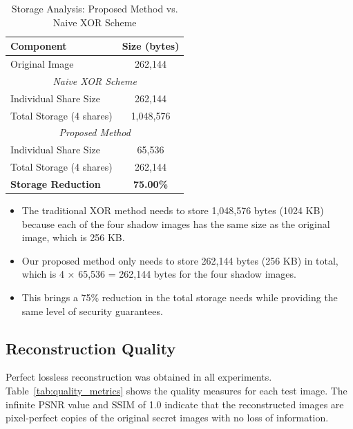 \begin{table}[h!]
\centering
\caption{Storage Analysis: Proposed Method vs. Naive XOR Scheme}
\label{tab:storage_analysis}
\begin{tabular}{|l|c|}
\hline
\textbf{Component} & \textbf{Size (bytes)} \\ \hline
Original Image & 262,144 \\ \hline
\multicolumn{2}{|c|}{\textit{Naive XOR Scheme}} \\ \hline
Individual Share Size & 262,144 \\ 
Total Storage (4 shares) & 1,048,576 \\ \hline
\multicolumn{2}{|c|}{\textit{Proposed Method}} \\ \hline
Individual Share Size & 65,536 \\ 
Total Storage (4 shares) & 262,144 \\ \hline
\textbf{Storage Reduction} & \textbf{75.00\%} \\ \hline
\end{tabular}
\end{table}

\begin{itemize}
\item The traditional XOR method needs to store 1,048,576 bytes (1024 KB) because each of the four shadow images has the same size as the original image, which is 256 KB.

\item Our proposed method only needs to store 262,144 bytes (256 KB) in total, which is 4 × 65,536 = 262,144 bytes for the four shadow images.

\item This brings a 75\% reduction in the total storage needs while providing the same level of security guarantees.
\end{itemize}

\subsection{Reconstruction Quality}

Perfect lossless reconstruction was obtained in all experiments. Table~\ref{tab:quality_metrics} shows the quality measures for each test image. The infinite PSNR value and SSIM of 1.0 indicate that the reconstructed images are pixel-perfect copies of the original secret images with no loss of information.

